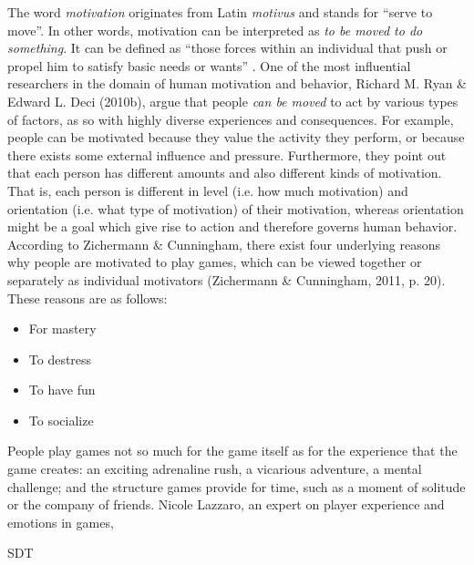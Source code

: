 The word \textit{motivation} originates from Latin \textit{motivus} and stands for ``serve to move''. In other words, motivation can be interpreted as \textit{to be moved to do something}. It can be defined as ``those forces within an individual that push or propel him to satisfy basic needs or wants'' \cite{pardee1990motivation}. One of the most influential researchers in the domain of human motivation and behavior, Richard M. Ryan \& Edward L. Deci (2010b), argue that people \textit{can be moved} to act by various types of factors, as so with highly diverse experiences and consequences. For example, people can be motivated because they value the activity they perform, or because there exists some external influence and pressure. Furthermore, they point out that each person has different amounts and also different kinds of motivation. That is, each person is different in level (i.e. how much motivation) and orientation (i.e. what type of motivation) of their motivation, whereas orientation might be a goal which give rise to action and therefore governs human behavior.  %
According to Zichermann \& Cunningham, there exist four underlying reasons why people are motivated to play games, which can be viewed together or separately as individual motivators (Zichermann \& Cunningham, 2011, p. 20). These reasons are as follows:
\begin{itemize}
\item For mastery
\item To destress
\item To have fun
\item To socialize
\end{itemize} 

People play games not so much for the game itself as for the experience
that the game creates: an exciting adrenaline rush, a vicarious adventure, a mental challenge;
and the structure games provide for time, such as a moment of solitude or the company of
friends.
Nicole Lazzaro, an expert on player experience and emotions in games, 


SDT
